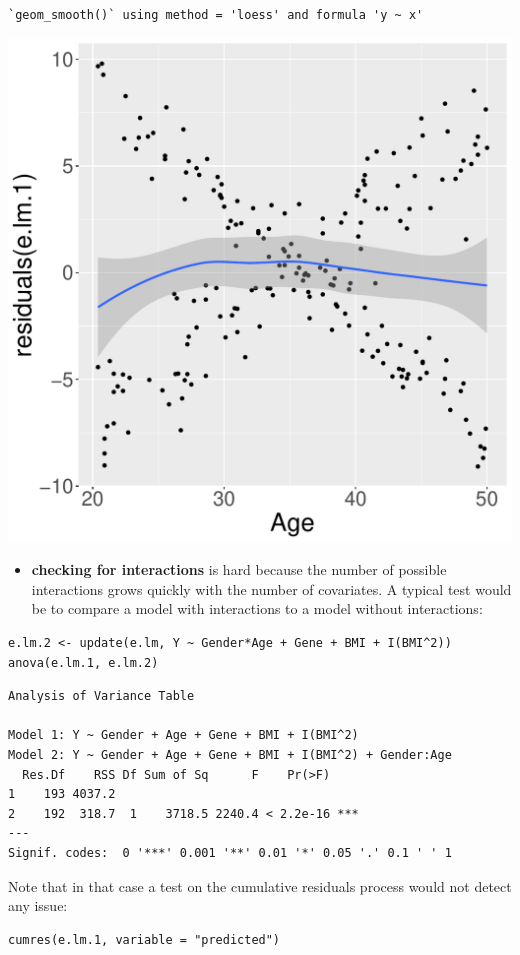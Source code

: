 \documentclass[12pt]{article}
\begin{document}
\begin{verbatim}
`geom_smooth()` using method = 'loess' and formula 'y ~ x'
\end{verbatim}

\begin{center}
\includegraphics[width=1\textwidth]{./figures/A1-Age.pdf}
\end{center} 

\begin{itemize}
\item \textbf{checking for interactions} is hard because the number of possible
interactions grows quickly with the number of covariates. A typical
test would be to compare a model with interactions to a model
without interactions:
\end{itemize}
\lstset{language=r,label= ,caption= ,captionpos=b,numbers=none}
\begin{lstlisting}
e.lm.2 <- update(e.lm, Y ~ Gender*Age + Gene + BMI + I(BMI^2))
anova(e.lm.1, e.lm.2)
\end{lstlisting}

\begin{verbatim}
Analysis of Variance Table

Model 1: Y ~ Gender + Age + Gene + BMI + I(BMI^2)
Model 2: Y ~ Gender + Age + Gene + BMI + I(BMI^2) + Gender:Age
  Res.Df    RSS Df Sum of Sq      F    Pr(>F)    
1    193 4037.2                                  
2    192  318.7  1    3718.5 2240.4 < 2.2e-16 ***
---
Signif. codes:  0 '***' 0.001 '**' 0.01 '*' 0.05 '.' 0.1 ' ' 1
\end{verbatim}
Note that in that case a test on the cumulative residuals process
would not detect any issue:
\lstset{language=r,label= ,caption= ,captionpos=b,numbers=none}
\begin{lstlisting}
cumres(e.lm.1, variable = "predicted")
\end{lstlisting}
\end{document}

